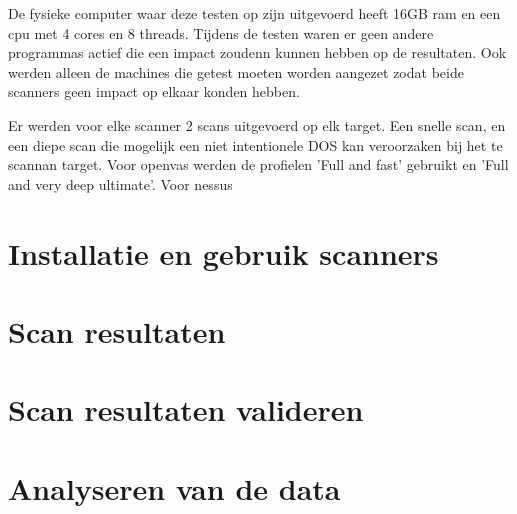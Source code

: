 De fysieke computer waar deze testen op zijn uitgevoerd heeft 16GB ram en een cpu met 4 cores en 8 threads. Tijdens de testen waren er geen andere programmas actief die een impact zoudenn kunnen hebben op de resultaten. Ook werden alleen de machines die getest moeten worden aangezet zodat beide scanners geen impact op elkaar konden hebben.

Er werden voor elke scanner 2 scans uitgevoerd op elk target. Een snelle scan, en een diepe scan die mogelijk een niet intentionele DOS kan veroorzaken bij het te scannan target. Voor openvas werden de profielen 'Full and fast' gebruikt en 'Full and very deep ultimate'. Voor nessus




\section{Installatie en gebruik scanners}


\section{Scan resultaten}

\section{Scan resultaten valideren}


\section{Analyseren van de data}

